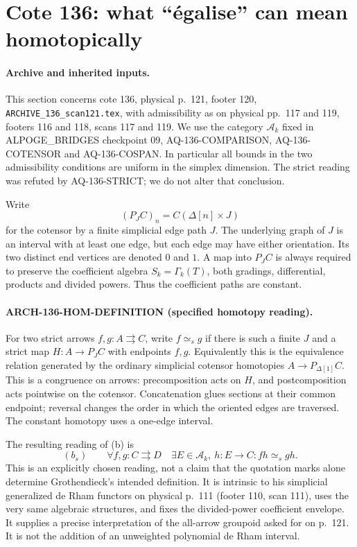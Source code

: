 \section{Cote 136: what ``\'egalise'' can mean homotopically}
\label{sec:136homotopy}

\paragraph{Archive and inherited inputs.}
This section concerns cote 136, physical p.~121, footer 120,
\texttt{ARCHIVE\_136\_scan121.tex}, with admissibility as on physical
pp.~117 and 119, footers 116 and 118, scans 117 and 119.  We use the
category $\mathcal A_k$ fixed in ALPOGE\_BRIDGES checkpoint 09,
AQ-136-COMPARISON, AQ-136-COTENSOR and AQ-136-COSPAN.  In particular
all bounds in the two admissibility conditions are uniform in the
simplex dimension.  The strict reading was refuted by AQ-136-STRICT;
we do not alter that conclusion.

Write
\[
 (P_J C)_n=C(\Delta[n]\times J)
\]
for the cotensor by a finite simplicial edge path $J$.  The underlying
graph of $J$ is an interval with at least one edge, but each edge may
have either orientation.  Its two distinct end vertices are denoted
$0$ and $1$.  A map into $P_J C$ is always required to preserve the
coefficient algebra $S_k=\Gamma_k(T)$, both gradings, differential,
products and divided powers.  Thus the coefficient paths are constant.

\paragraph{ARCH-136-HOM-DEFINITION (specified homotopy reading).}
For two strict arrows $f,g:A\rightrightarrows C$, write $f\simeq_s g$
if there is such a finite $J$ and a strict map
$H:A\to P_J C$ with endpoints $f,g$.  Equivalently this is the
equivalence relation generated by the ordinary simplicial cotensor
homotopies $A\to P_{\Delta[1]}C$.  This is a congruence on arrows:
precomposition acts on $H$, and postcomposition acts pointwise on
the cotensor.  Concatenation glues sections at their common endpoint;
reversal changes the order in which the oriented edges are traversed.
The constant homotopy uses a one-edge interval.

The resulting reading of (b) is
\[
 (b_s)\qquad
 \forall f,g:C\rightrightarrows D\quad
 \exists E\in\mathcal A_k,\ h:E\to C:
                         fh\simeq_s gh.
\]
This is an explicitly chosen reading, not a claim that the quotation
marks alone determine Grothendieck's intended definition.  It is
intrinsic to his simplicial generalized de Rham functors on physical
p.~111 (footer 110, scan 111), uses the very same algebraic structures,
and fixes the divided-power coefficient envelope.  It supplies a
precise interpretation of the all-arrow groupoid asked for on p.~121.
It is not the addition of an unweighted polynomial de Rham interval.


